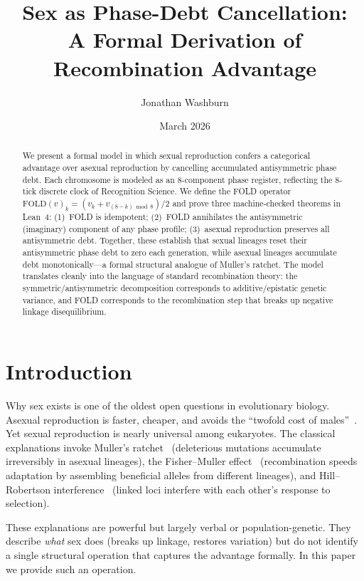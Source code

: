 \documentclass[11pt,twocolumn]{article}
\title{Sex as Phase-Debt Cancellation:\\A Formal Derivation of Recombination Advantage}
\author[1]{Jonathan Washburn}
\affil[1]{Independent Researcher}
\date{March 2026}
\begin{document}
\maketitle

\begin{abstract}
We present a formal model in which sexual reproduction confers a
categorical advantage over asexual reproduction by cancelling accumulated
antisymmetric phase debt. Each chromosome is modeled as an 8-component
phase register, reflecting the 8-tick discrete clock of Recognition
Science. We define the FOLD operator
$\mathrm{FOLD}(v)_k = (v_k + v_{(8-k) \bmod 8})/2$ and prove three
machine-checked theorems in Lean~4: (1)~FOLD is idempotent; (2)~FOLD
annihilates the antisymmetric (imaginary) component of any phase profile;
(3)~asexual reproduction preserves all antisymmetric debt. Together, these
establish that sexual lineages reset their antisymmetric phase debt to
zero each generation, while asexual lineages accumulate debt
monotonically---a formal structural analogue of Muller's ratchet. The
model translates cleanly into the language of standard recombination
theory: the symmetric/antisymmetric decomposition corresponds to
additive/epistatic genetic variance, and FOLD corresponds to the
recombination step that breaks up negative linkage disequilibrium.
\end{abstract}

\section{Introduction}

Why sex exists is one of the oldest open questions in evolutionary
biology. Asexual reproduction is faster, cheaper, and avoids the
``twofold cost of males''~\cite{Maynard1978}. Yet sexual reproduction
is nearly universal among eukaryotes. The classical explanations invoke
Muller's ratchet~\cite{Muller1964} (deleterious mutations accumulate
irreversibly in asexual lineages), the Fisher--Muller
effect~\cite{Fisher1930, Muller1932} (recombination speeds adaptation by
assembling beneficial alleles from different lineages), and
Hill--Robertson interference~\cite{Hill1966} (linked loci interfere with
each other's response to selection).

These explanations are powerful but largely verbal or population-genetic.
They describe \emph{what} sex does (breaks up linkage, restores variation)
but do not identify a single structural operation that captures the
advantage formally. In this paper we provide such an operation.
\end{document}
